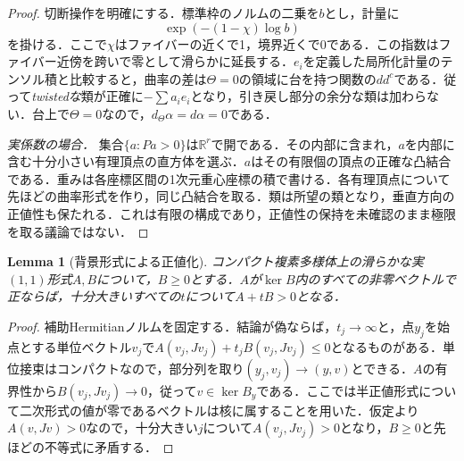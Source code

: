 \documentclass[12pt]{amsart}
\newtheorem{lem}[thm]{Lemma}
\theoremstyle{definition}
\theoremstyle{remark}
\numberwithin{equation}{section}
\newcommand{\R}{\mathbb{R}}
\begin{document}
\begin{proof}
切断操作を明確にする．標準枠のノルムの二乗を$b$とし，計量に
\[
 \exp(-(1-\chi)\log b)
\]
を掛ける．ここで$\chi$はファイバーの近くで1，境界近くで0である．この指数はファイバー近傍を跨いで零として滑らかに延長する．$e_i$を定義した局所化計量のテンソル積と比較すると，曲率の差は$\Theta=0$の領域に台を持つ関数の$dd^c$である．従って\emph{twistedな}類が正確に$-\sum a_ie_i$となり，引き戻し部分の余分な類は加わらない．台上で$\Theta=0$なので，$d_\Theta\alpha=d\alpha=0$である．

\emph{実係数の場合．} 集合$\{a:Pa>0\}$は$\R^r$で開である．その内部に含まれ，$a$を内部に含む十分小さい有理頂点の直方体を選ぶ．$a$はその有限個の頂点の正確な凸結合である．重みは各座標区間の1次元重心座標の積で書ける．各有理頂点について先ほどの曲率形式を作り，同じ凸結合を取る．類は所望の類となり，垂直方向の正値性も保たれる．これは有限の構成であり，正値性の保持を未確認のまま極限を取る議論ではない．
\end{proof}

\begin{lem}[背景形式による正値化]\label{lem:domination}
コンパクト複素多様体上の滑らかな実$(1,1)$形式$A,B$について，$B\geq0$とする．$A$が$\ker B$内のすべての非零ベクトルで正ならば，十分大きいすべての$t$について$A+tB>0$となる．
\end{lem}
\begin{proof}
補助Hermitianノルムを固定する．結論が偽ならば，$t_j\to\infty$と，点$y_j$を始点とする単位ベクトル$v_j$で$A(v_j,Jv_j)+t_jB(v_j,Jv_j)\leq0$となるものがある．単位接束はコンパクトなので，部分列を取り$(y_j,v_j)\to(y,v)$とできる．$A$の有界性から$B(v_j,Jv_j)\to0$，従って$v\in\ker B_y$である．ここでは半正値形式について二次形式の値が零であるベクトルは核に属することを用いた．仮定より$A(v,Jv)>0$なので，十分大きい$j$について$A(v_j,Jv_j)>0$となり，$B\geq0$と先ほどの不等式に矛盾する．
\end{proof}
\end{document}
